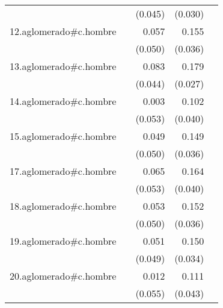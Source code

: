 {\begin{longtable}{l*{4}{D{.}{.}{-1}}}
            &                     &     (0.045)         &     (0.030)         &                     \\
\addlinespace
12.aglomerado#c.hombre&                     &       0.057         &       0.155\sym{***}&                     \\
            &                     &     (0.050)         &     (0.036)         &                     \\
\addlinespace
13.aglomerado#c.hombre&                     &       0.083         &       0.179\sym{***}&                     \\
            &                     &     (0.044)         &     (0.027)         &                     \\
\addlinespace
14.aglomerado#c.hombre&                     &       0.003         &       0.102\sym{*}  &                     \\
            &                     &     (0.053)         &     (0.040)         &                     \\
\addlinespace
15.aglomerado#c.hombre&                     &       0.049         &       0.149\sym{***}&                     \\
            &                     &     (0.050)         &     (0.036)         &                     \\
\addlinespace
17.aglomerado#c.hombre&                     &       0.065         &       0.164\sym{***}&                     \\
            &                     &     (0.053)         &     (0.040)         &                     \\
\addlinespace
18.aglomerado#c.hombre&                     &       0.053         &       0.152\sym{***}&                     \\
            &                     &     (0.050)         &     (0.036)         &                     \\
\addlinespace
19.aglomerado#c.hombre&                     &       0.051         &       0.150\sym{***}&                     \\
            &                     &     (0.049)         &     (0.034)         &                     \\
\addlinespace
20.aglomerado#c.hombre&                     &       0.012         &       0.111\sym{**} &                     \\
            &                     &     (0.055)         &     (0.043)         &                     \\

\end{longtable}}
